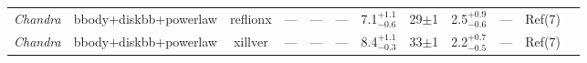\documentclass{aa}
\begin{document}
\begin{sidewaystable*}
\begin{tabular}{llcccccccccc}
\emph{Chandra}  & 
bbody+diskbb+powerlaw & 
reflionx &
--- &
--- &
---  &
7.1$^{+1.1}_{-0.6}$ &
29$\pm$1 &
2.5$^{+0.9}_{-0.6}$  &
--- &
Ref(7) \\


\emph{Chandra}  & 
bbody+diskbb+powerlaw & 
xillver &
--- &
--- &
---  &
8.4$^{+1.1}_{-0.3}$ &
33$\pm$1 &
2.2$^{+0.7}_{-0.5}$ &
--- &
Ref(7) \\

\hline

\hline   
         
\end{tabular}

 \\
\end{sidewaystable*}




\end{document}
